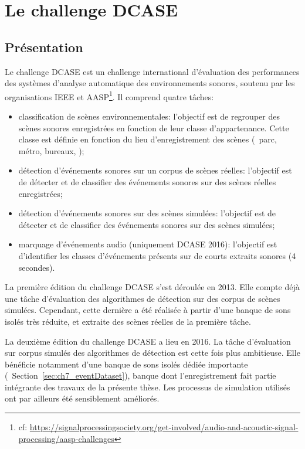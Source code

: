 \section{Le challenge DCASE}
\label{sec:ch6_challengeDcasePresentation}

\subsection{Présentation}

Le challenge DCASE est un challenge international d'évaluation des performances des systèmes d'analyse automatique des environnements sonores, soutenu par les organisations IEEE et AASP\footnote{cf: \url{https://signalprocessingsociety.org/get-involved/audio-and-acoustic-signal-processing/aasp-challenges}}. Il comprend quatre tâches:

\begin{itemize}
\item classification de scènes environnementales: l'objectif est de regrouper des scènes sonores enregistrées en fonction de leur classe d'appartenance. Cette classe est définie en fonction du lieu d'enregistrement des scènes (\eg~parc, métro, bureaux, \etc);
\item détection d'événements sonores sur un corpus de scènes réelles: l'objectif est de détecter et de classifier des événements sonores sur des scènes réelles enregistrées;
\item détection d'événements sonores sur des scènes simulées: l'objectif est de détecter et de classifier des événements sonores sur des scènes simulées;
\item marquage d'événements audio (uniquement DCASE 2016): l'objectif est d'identifier les classes d'événements présents sur de courts extraits sonores (4 secondes).
\end{itemize}

La première édition du challenge DCASE \citep{Giannoulis2013database, giannoulis2013detection, Stowell15} s'est déroulée en 2013. Elle compte déjà une tâche d'évaluation des algorithmes de détection sur des corpus de scènes simulées. Cependant, cette dernière a été réalisée à partir d'une banque de sons isolés très réduite, et extraite des scènes réelles de la première tâche.

La deuxième édition du challenge DCASE a lieu en 2016. La tâche d'évaluation sur corpus simulés des algorithmes de détection est cette fois plus ambitieuse. Elle bénéficie notamment d'une banque de sons isolés dédiée importante (\cf~Section~\ref{sec:ch7_eventDataset}), banque dont l'enregistrement fait partie intégrante des travaux de la présente thèse. Les processus de simulation utilisés ont par ailleurs été sensiblement améliorés.

